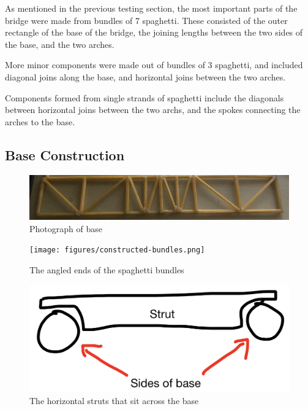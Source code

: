 \documentclass[a4paper,11pt]{article}
\begin{document}
As mentioned in the previous testing section, the most important parts of the
bridge were made from bundles of 7 spaghetti.
These consisted of the outer rectangle of the base of the bridge, the joining
lengths between the two sides of the base, and the two arches.

More minor components were made out of bundles of 3 spaghetti, and
included diagonal joins along the base, and horizontal joins between the two
arches.

Components formed from single strands of spaghetti include the diagonals between
horizontal joins between the two archs, and the spokes connecting the arches to
the base.


\subsection{Base Construction}

\begin{figure}
\begin{center}
\includegraphics[width=\textwidth]{figures/base.png}
\end{center}
\caption{Photograph of base}
\label{construction:base}
\end{figure}

\begin{figure}
\begin{center}
\texttt{[image: figures/constructed-bundles.png]}
\end{center}
\caption{The angled ends of the spaghetti bundles}
\label{construction:bundles}
\end{figure}

\begin{figure}
\begin{center}
\includegraphics[width=\textwidth]{figures/struts.png}
\end{center}
\caption{The horizontal struts that sit across the base}
\label{construction:struts}
\end{figure}
\end{document}
